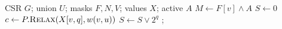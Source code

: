 \begin{algorithm}[t]
  \caption{\sharedexpand: exact cross-query vertex sharing}
  \label{alg:shared-expand}
  \footnotesize
  \begin{algorithmic}[1]
    \Require CSR $G$; union $U$; masks $F,N,V$; values $X$; active $A$
      \State $M\gets F[v]\land A$
        \State $S\gets 0$ 
          \State $c\gets P.\Call{Relax}{X[v,q],w(v,u)}$
            \State $S\gets S\lor 2^q$
          \EndIf
        \EndFor
          \State {}; 
        \EndIf
      \EndFor
    \EndFor
  \end{algorithmic}
\end{algorithm}
